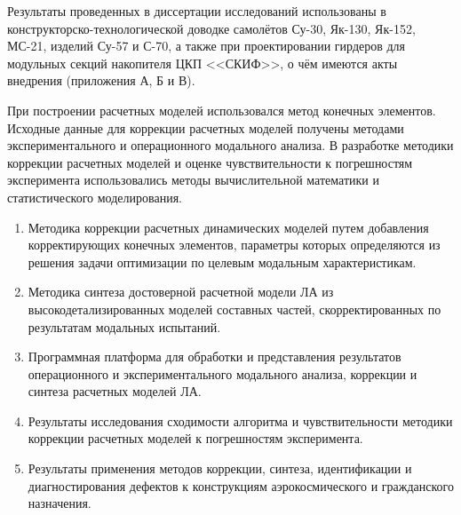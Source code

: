 Результаты проведенных в диссертации исследований использованы в конструкторско-технологической доводке самолётов Су-30, Як-130, Як-152, МС-21, изделий Су-57 и С-70, а также при проектировании гирдеров для модульных секций накопителя ЦКП <<СКИФ>>, о чём имеются акты внедрения (приложения А, Б и В).

{\methods}

При построении расчетных моделей использовался метод конечных элементов. Исходные данные для коррекции расчетных моделей получены методами экспериментального и операционного модального анализа. В разработке методики коррекции расчетных моделей и оценке чувствительности к погрешностям эксперимента использовались методы вычислительной математики и статистического моделирования. 

{}
\begin{enumerate}[beginpenalty = 10000] 
	\item Методика коррекции расчетных динамических моделей путем добавления корректирующих конечных элементов, параметры которых определяются из решения задачи оптимизации по целевым модальным характеристикам.
	\item Методика синтеза достоверной расчетной модели ЛА из высокодетализированных моделей составных частей, скорректированных по результатам модальных испытаний.
	\item Программная платформа для обработки и представления результатов операционного и экспериментального модального анализа, коррекции и синтеза расчетных моделей ЛА.
	\item Результаты исследования сходимости алгоритма и чувствительности методики коррекции расчетных моделей к погрешностям эксперимента. 
	\item Результаты применения методов коррекции, синтеза, идентификации и диагностирования дефектов к конструкциям аэрокосмического и гражданского назначения.
\end{enumerate}

{\reliability} 


